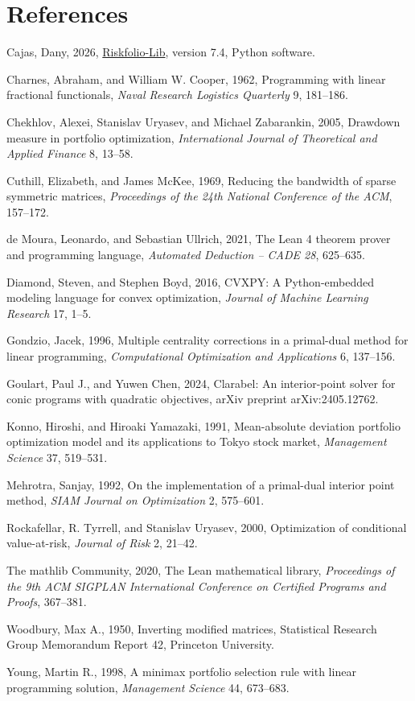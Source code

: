 \documentclass[10pt,twocolumn,letterpaper]{article}
\begin{document}
\section*{References}
\footnotesize
\begin{list}{}{\setlength{\leftmargin}{1.4em}\setlength{\itemindent}{-1.4em}\setlength{\itemsep}{1.5pt}\setlength{\parsep}{0pt}}
\item Cajas, Dany, 2026, \href{https://github.com/dcajasn/Riskfolio-Lib}{Riskfolio-Lib}, version 7.4, Python software.
\item Charnes, Abraham, and William W. Cooper, 1962, Programming with linear fractional functionals, \textit{Naval Research Logistics Quarterly} 9, 181--186.
\item Chekhlov, Alexei, Stanislav Uryasev, and Michael Zabarankin, 2005, Drawdown measure in portfolio optimization, \textit{International Journal of Theoretical and Applied Finance} 8, 13--58.
\item Cuthill, Elizabeth, and James McKee, 1969, Reducing the bandwidth of sparse symmetric matrices, \textit{Proceedings of the 24th National Conference of the ACM}, 157--172.
\item de Moura, Leonardo, and Sebastian Ullrich, 2021, The Lean 4 theorem prover and programming language, \textit{Automated Deduction -- CADE 28}, 625--635.
\item Diamond, Steven, and Stephen Boyd, 2016, CVXPY: A Python-embedded modeling language for convex optimization, \textit{Journal of Machine Learning Research} 17, 1--5.
\item Gondzio, Jacek, 1996, Multiple centrality corrections in a primal-dual method for linear programming, \textit{Computational Optimization and Applications} 6, 137--156.
\item Goulart, Paul J., and Yuwen Chen, 2024, Clarabel: An interior-point solver for conic programs with quadratic objectives, arXiv preprint arXiv:2405.12762.
\item Konno, Hiroshi, and Hiroaki Yamazaki, 1991, Mean-absolute deviation portfolio optimization model and its applications to Tokyo stock market, \textit{Management Science} 37, 519--531.
\item Mehrotra, Sanjay, 1992, On the implementation of a primal-dual interior point method, \textit{SIAM Journal on Optimization} 2, 575--601.
\item Rockafellar, R. Tyrrell, and Stanislav Uryasev, 2000, Optimization of conditional value-at-risk, \textit{Journal of Risk} 2, 21--42.
\item The mathlib Community, 2020, The Lean mathematical library, \textit{Proceedings of the 9th ACM SIGPLAN International Conference on Certified Programs and Proofs}, 367--381.
\item Woodbury, Max A., 1950, Inverting modified matrices, Statistical Research Group Memorandum Report 42, Princeton University.
\item Young, Martin R., 1998, A minimax portfolio selection rule with linear programming solution, \textit{Management Science} 44, 673--683.
\end{list}
\end{document}
